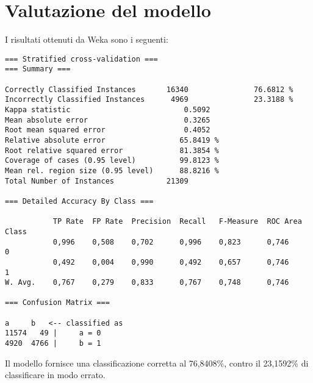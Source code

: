\section{Valutazione del modello}
I risultati ottenuti da Weka sono i seguenti:
\begin{mdframed}
\begin{verbatim}
=== Stratified cross-validation ===
=== Summary ===

Correctly Classified Instances       16340               76.6812 %
Incorrectly Classified Instances      4969               23.3188 %
Kappa statistic                          0.5092
Mean absolute error                      0.3265
Root mean squared error                  0.4052
Relative absolute error                 65.8419 %
Root relative squared error             81.3854 %
Coverage of cases (0.95 level)          99.8123 %
Mean rel. region size (0.95 level)      88.8216 %
Total Number of Instances            21309     

=== Detailed Accuracy By Class ===

           TP Rate  FP Rate  Precision  Recall   F-Measure  ROC Area  Class
           0,996    0,508    0,702      0,996    0,823      0,746     0
           0,492    0,004    0,990      0,492    0,657      0,746     1
W. Avg.    0,767    0,279    0,833      0,767    0,748      0,746     

=== Confusion Matrix ===

a     b   <-- classified as
11574   49 |     a = 0
4920  4766 |     b = 1
\end{verbatim}
\end{mdframed}
%
%
%
%

Il modello fornisce una classificazione corretta al 76,8408\%, contro il 23,1592\% di classificare in modo errato.